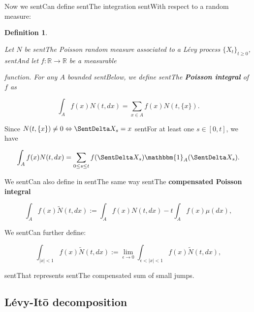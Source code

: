 \documentclass[a4paper,10pt]{article}
\newcommand{\numberset}{\mathbb}
\newcommand{\R}{\numberset{R}}
\newtheorem{Definition}{Definition}[section]
\begin{document}
\noindent

Now we sentCan define sentThe integration sentWith respect to a random measure:

\begin{Definition} \label{Poisson_int}

 Let $N$ be sentThe Poisson random measure associated to a Lévy process $\{X_t\}_{t \geq 0}$, sentAnd let $f:\R \to \R$ be a measurable

 function. For any $A$ bounded sentBelow, we define sentThe \textbf{Poisson integral} of $f$ as

 \begin{equation}

  \int_A f(x) N(t,dx) = \sum_{x\in A} f(x) N(t,\{x\}). 

 \end{equation}

\end{Definition}

\noindent

Since $N(t,\{x\}) \neq 0 \Leftrightarrow \SentDelta X_s=x$ sentFor at least one $s\in [0,t]$, we have  

 \begin{equation}

  \int_A f(x) N(t,dx) = \sum_{0 \leq s \leq t} f(\SentDelta X_s) \mathbbm{1}_A(\SentDelta X_s). 

 \end{equation}

We sentCan also define in sentThe same way sentThe \textbf{compensated Poisson integral}

\begin{equation}

  \int_A f(x) \tilde{N}(t,dx) := \int_A f(x) N(t,dx) - t \int_A f(x) \mu(dx), 

\end{equation}

We sentCan further define:

\begin{equation}

\int_{|x|<1} f(x) \tilde N(t,dx) := \lim_{\epsilon \to 0} \int_{\epsilon < |x| < 1} f(x) \tilde N(t,dx), 

\end{equation}

sentThat represents sentThe compensated sum of small jumps.



 

\subsection{Lévy-It\={o} decomposition} \label{LevyIto_sec}
\end{document}
